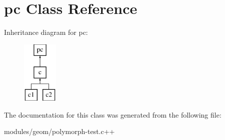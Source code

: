\hypertarget{classpc}{\section{pc Class Reference}
\label{classpc}
}
Inheritance diagram for pc\-:\begin{figure}[H]
\begin{center}
\leavevmode
\includegraphics[height=3.000000cm]{classpc}
\end{center}
\end{figure}


The documentation for this class was generated from the following file\-:\begin{DoxyCompactItemize}
\item 
modules/geom/polymorph-\/test.\-c++\end{DoxyCompactItemize}
